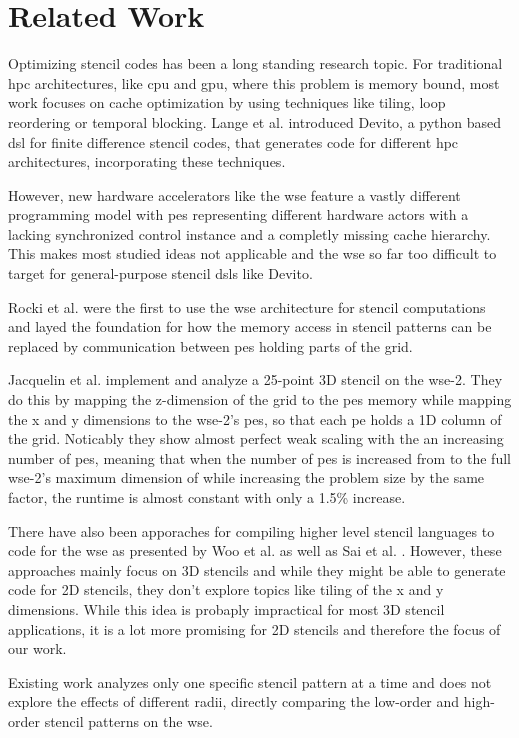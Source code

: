 \chapter{Related Work}
Optimizing stencil codes has been a long standing research topic.
For traditional \ac{hpc} architectures, like \ac{cpu} and \ac{gpu}, where this problem is memory bound, most work focuses on cache optimization by using techniques like tiling, loop reordering or temporal blocking.
Lange et al. \cite{lange2016devito} introduced Devito, a python based \ac{dsl} for finite difference stencil codes, that generates code for different \ac{hpc} architectures, incorporating these techniques.

However, new hardware accelerators like the \ac{wse} feature a vastly different programming model with \acp{pe} representing different hardware actors with a lacking synchronized control instance and a completly missing cache hierarchy. This makes most studied ideas not applicable and the \ac{wse} so far too difficult to target for general-purpose stencil \ac{dsl}s like Devito.

Rocki et al. \cite{rocki2020fast} were the first to use the \ac{wse} architecture for stencil computations and layed the foundation for how the memory access in stencil patterns can be replaced by communication between \ac{pe}s holding parts of the grid.

Jacquelin et al. \cite{jacquelin2022massively} implement and analyze a 25-point 3D stencil on the \ac{wse}-2.
They do this by mapping the z-dimension of the grid to the \ac{pe}s memory while mapping the x and y dimensions to the \ac{wse}-2's \ac{pe}s, so that each \ac{pe} holds a 1D column of the grid.
Noticably they show almost perfect weak scaling with the an increasing number of \ac{pe}s, meaning that when the number of \ac{pe}s is increased from  to the full \ac{wse}-2's maximum dimension of  while increasing the problem size by the same factor, the runtime is almost constant with only a 1.5\% increase.

There have also been apporaches for compiling higher level stencil languages to code for the \ac{wse} as presented by Woo et al. \cite{woo2022disruptive} as well as Sai et al. \cite{sai2024automated}. However, these approaches mainly focus on 3D stencils and while they might be able to generate code for 2D stencils, they don't explore topics like tiling of the x and y dimensions. While this idea is probaply impractical for most 3D stencil applications, it is a lot more promising for 2D stencils and therefore the focus of our work.

Existing work analyzes only one specific stencil pattern at a time and does not explore the effects of different radii, directly comparing the low-order and high-order stencil patterns on the \ac{wse}.